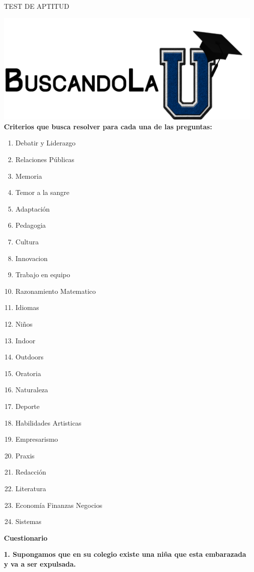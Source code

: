 \documentclass{article}
\begin{document}
\begin{center}
{\Huge TEST DE APTITUD}
\end{center}
 \includegraphics[scale=1]{logo.png} 
\pagebreak \\
\textbf{Criterios que busca resolver para cada una de las preguntas:}
\begin{enumerate}
\item Debatir y Liderazgo 
\item Relaciones Públicas
\item Memoria
\item Temor a la sangre	
\item Adaptación
\item Pedagogia
\item Cultura
\item Innovacion
\item Trabajo en equipo
\item Razonamiento Matematico
\item Idiomas
\item Niños 
\item Indoor
\item Outdoors
\item Oratoria
\item Naturaleza
\item Deporte
\item Habilidades Artisticas
\item Empresarismo
\item Praxis
\item Redacción
\item Literatura
\item Economía Finanzas Negocios
\item Sistemas
\end{enumerate}
\pagebreak
\begin{center}
{\Large \textbf{Cuestionario} } \\
\end{center}
\textbf{1. Supongamos que en su colegio existe una niña que esta embarazada y va a ser expulsada.} \\
\end{document}
